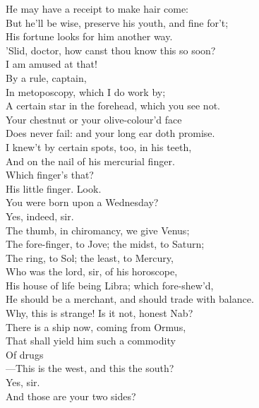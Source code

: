 \documentclass[a4paper,oneside]{memoir}
\begin{document}
\begin{drama*}
He may have a receipt to make hair come:\\
But he'll be wise, preserve his youth, and fine for't;\\
His fortune looks for him another way.\\
\facespeaks 'Slid, doctor, how canst thou know this so soon?\\
I am amused at that!\\
\subtlespeaks {} By a rule, captain,\\
In metoposcopy, which I do work by;\\
A certain star in the forehead, which you see not.\\
Your chestnut or your olive-colour'd face\\
Does never fail: and your long ear doth promise.\\
I knew't by certain spots, too, in his teeth,\\
And on the nail of his mercurial finger.\\
\facespeaks Which finger's that?\\
\subtlespeaks {} His little finger. Look.\\
You were born upon a Wednesday?\\
\druggerspeaks {} Yes, indeed, sir.\\
\subtlespeaks The thumb, in chiromancy, we give Venus;\\
The fore-finger, to Jove; the midst, to Saturn;\\
The ring, to Sol; the least, to Mercury,\\
Who was the lord, sir, of his horoscope,\\
His house of life being Libra; which fore-shew'd,\\
He should be a merchant, and should trade with balance.\\
\facespeaks Why, this is strange! Is it not, honest Nab?\\
\subtlespeaks There is a ship now, coming from Ormus,\\
That shall yield him such a commodity\\
Of drugs\\
 ---This is the west, and this the south?\\
\druggerspeaks {} Yes, sir.\\
\subtlespeaks And those are your two sides?\\

\end{drama*}
\end{document}
